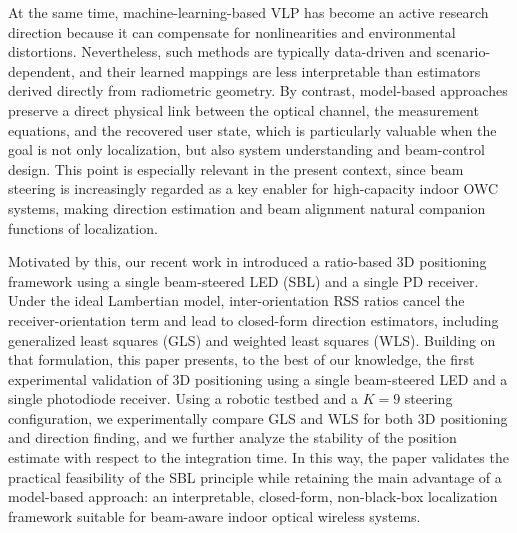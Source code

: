 At the same time, machine-learning-based VLP has become an active research direction because it can compensate for nonlinearities and environmental distortions. Nevertheless, such methods are typically data-driven and scenario-dependent, and their learned mappings are less interpretable than estimators derived directly from radiometric geometry. By contrast, model-based approaches preserve a direct physical link between the optical channel, the measurement equations, and the recovered user state, which is particularly valuable when the goal is not only localization, but also system understanding and beam-control design. This point is especially relevant in the present context, since beam steering is increasingly regarded as a key enabler for high-capacity indoor OWC systems, making direction estimation and beam alignment natural companion functions of localization.

Motivated by this, our recent work in \cite{acuna2025model} introduced a ratio-based 3D positioning framework using a single beam-steered LED (SBL) and a single PD receiver. Under the ideal Lambertian model, inter-orientation RSS ratios cancel the receiver-orientation term and lead to closed-form direction estimators, including generalized least squares (GLS) and weighted least squares (WLS). Building on that formulation, this paper presents, to the best of our knowledge, the first experimental validation of 3D positioning using a single beam-steered LED and a single photodiode receiver. Using a robotic testbed and a $K=9$ steering configuration, we experimentally compare GLS and WLS for both 3D positioning and direction finding, and we further analyze the stability of the position estimate with respect to the integration time. In this way, the paper validates the practical feasibility of the SBL principle while retaining the main advantage of a model-based approach: an interpretable, closed-form, non-black-box localization framework suitable for beam-aware indoor optical wireless systems.